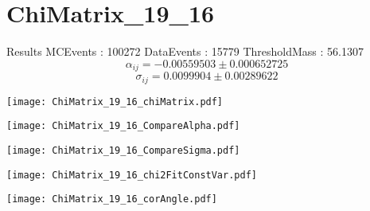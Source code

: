 \documentclass[a4paper,12pt]{article}
\begin{document}
\section{ChiMatrix\_19\_16}
\begin{minipage}{0.49\linewidth} Results \newline
MCEvents : 100272\newline
DataEvents : 15779 \newline
ThresholdMass : 56.1307\\
$$\alpha_{ij} = -0.00559503\pm 0.000652725$$
$$\sigma_{ij} = 0.0099904\pm 0.00289622$$
\end{minipage}\hfill
\begin{minipage}{0.49\linewidth} 
\texttt{[image: ChiMatrix\_19\_16\_chiMatrix.pdf]}\\
\end{minipage}
\hfill
\begin{minipage}{0.49\linewidth} 
\texttt{[image: ChiMatrix\_19\_16\_CompareAlpha.pdf]}\\
\end{minipage}
\hfill
\begin{minipage}{0.49\linewidth} 
\texttt{[image: ChiMatrix\_19\_16\_CompareSigma.pdf]}\\
\end{minipage}
\begin{minipage}{0.49\linewidth} 
\texttt{[image: ChiMatrix\_19\_16\_chi2FitConstVar.pdf]}\\
\end{minipage}
\hfill
\begin{minipage}{0.49\linewidth} 
\texttt{[image: ChiMatrix\_19\_16\_corAngle.pdf]}\\
\end{minipage}
\end{document}

